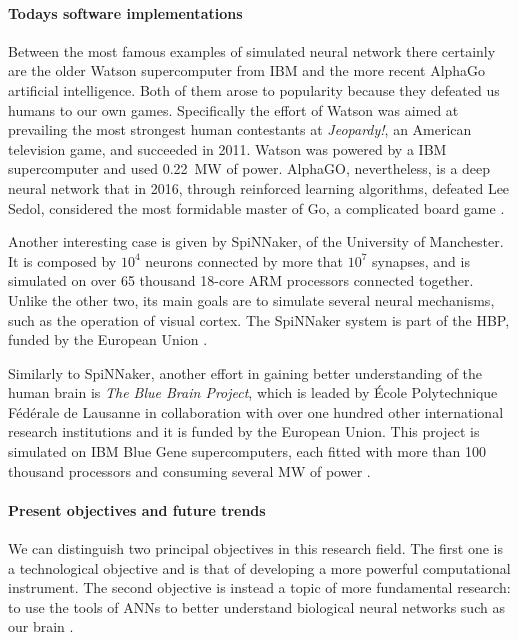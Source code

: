 \paragraph{Todays software implementations\\}
Between the most famous examples of simulated neural network there certainly are the older Watson supercomputer from IBM and the more recent AlphaGo artificial intelligence.
Both of them arose to popularity because they defeated us humans to our own games.
Specifically the effort of Watson was aimed at prevailing the most strongest human contestants at \textit{Jeopardy!}, an American television game, and succeeded in 2011.
Watson was powered by a IBM supercomputer and used \SI{0.22}{\MW} of power.
AlphaGO, nevertheless, is a deep neural network that in 2016, through reinforced learning algorithms, defeated Lee Sedol, considered the most formidable master of Go, a complicated board game \cite{Nawrocki2016a}.

Another interesting case is given by SpiNNaker, of the University of Manchester.
It is composed by $10^4$ neurons connected by more that $10^7$ synapses, and is simulated on over 65 thousand 18-core ARM processors connected together.
Unlike the other two, its main goals are to simulate several neural mechanisms, such as the operation of visual cortex.
The SpiNNaker system is part of the \ac{HBP}, funded by the European Union \cite{HBP.eu, Nawrocki2016a}.

Similarly to SpiNNaker, another effort in gaining better understanding of the human brain is \textit{The Blue Brain Project}, which is leaded by École Polytechnique Fédérale de Lausanne in collaboration with over one hundred other international research institutions and it is funded by the European Union.
This project is simulated on IBM Blue Gene supercomputers, each fitted with more than 100 thousand processors and consuming several \si{\MW} of power \cite{Nawrocki2016a}.

\paragraph{Present objectives and future trends\\}
We can distinguish two principal objectives in this research field.
The first one is a technological objective and is that of developing a more powerful computational instrument.
The second objective is instead a topic of more fundamental research: to use the tools of \acp{ANN} to better understand biological neural networks such as our brain \cite{sciamHBP, HBP.eu}.

